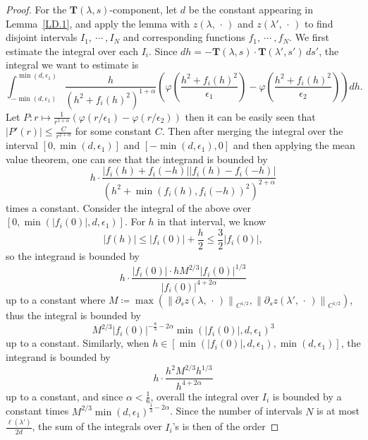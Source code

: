 \documentclass[reqno,centertags,12pt]{amsart}
\theoremstyle{definition}
\numberwithin{equation}{section}
\newcommand{\abs}[1]{\left\lvert#1\right\rvert}
\newcommand{\norm}[1]{\left\|#1\right\|}
\begin{document}
\begin{proof}
    For the $\mathbf{T}(\lambda,s)$-component, let $d$ be the constant appearing in
    Lemma~\ref{LD.1}, and apply the lemma with
    $z(\lambda,\,\cdot\,)$ and $z(\lambda',\,\cdot\,)$ to
    find disjoint intervals $I_{1},\ \cdots\ ,I_{N}$ and corresponding functions
    $f_{1},\ \cdots\ ,f_{N}$. We first estimate the integral over each $I_{i}$.
    Since $dh = -\mathbf{T}(\lambda,s)\cdot\mathbf{T}(\lambda',s')\,ds'$,
    the integral we want to estimate is
    \[
        \int_{-\min(d,\epsilon_{1})}^{\min(d,\epsilon_{1})}
        \frac{h}{(h^{2}+f_{i}(h)^{2})^{1+\alpha}}
        \left(
            \varphi\left(\frac{h^{2}+f_{i}(h)^{2}}{\epsilon_{1}}\right)
            - \varphi\left(\frac{h^{2}+f_{i}(h)^{2}}{\epsilon_{2}}\right)
        \right)dh.
    \]
    Let $P\colon r\mapsto \frac{1}{r^{1+\alpha}}
    \left(\varphi(r/\epsilon_{1}) - \varphi(r/\epsilon_{2})\right)$ then it can be
    easily seen that $\abs{P'(r)}\leq\frac{C}{r^{2+\alpha}}$ for some constant $C$.
    Then after merging the integral over the interval $[0,\min(d,\epsilon_{1})]$
    and $[-\min(d,\epsilon_{1}),0]$ and then applying the mean value theorem, one can see that
    the integrand is bounded by
    \[
        h\cdot \frac{\abs{f_{i}(h) + f_{i}(-h)}\abs{f_{i}(h) - f_{i}(-h)}}
        {(h^{2}+\min(f_{i}(h),f_{i}(-h))^{2})^{2+\alpha}}
    \]
    times a constant. Consider the integral of the above over
    $[0,\min(\abs{f_{i}(0)},d,\epsilon_{1})]$. For $h$ in that interval, we know
    \[
        \abs{f(h)} \leq \abs{f_{i}(0)} + \frac{h}{2}
        \leq \frac{3}{2}\abs{f_{i}(0)},
    \]
    so the integrand is bounded by
    \[
        h\cdot\frac{\abs{f_{i}(0)}\cdot
        hM^{2/3}\abs{f_{i}(0)}^{1/3}}
        {\abs{f_{i}(0)}^{4+2\alpha}}
    \]
    up to a constant where $M\coloneqq\max\left(
        \norm{\partial_{s}z(\lambda,\,\cdot\,)}_{C^{1/2}},
        \norm{\partial_{s}z(\lambda',\,\cdot\,)}_{C^{1/2}}
    \right)$, thus the integral is bounded by
    \[
        M^{2/3}\abs{f_{i}(0)}^{-\frac{8}{3}-2\alpha}
        \min(\abs{f_{i}(0)},d,\epsilon_{1})^{3}
    \]
    up to a constant. Similarly, when $h\in\left[\min(\abs{f_{i}(0)},d,\epsilon_{1}),
    \min(d,\epsilon_{1})\right]$, the integrand is bounded by
    \[
        h\cdot \frac{h^{2}M^{2/3}h^{1/3}}
        {h^{4+2\alpha}}
    \]
    up to a constant, and since $\alpha<\frac{1}{6}$, overall the integral over $I_{i}$
    is bounded by a constant times
    $M^{2/3}\min(d,\epsilon_{1})^{\frac{1}{3}-2\alpha}$.
    Since the number of intervals $N$ is at most $\frac{\ell(\lambda')}{2d}$,
    the sum of the integrals over $I_{i}$'s is then of the order

\end{proof}
\end{document}
